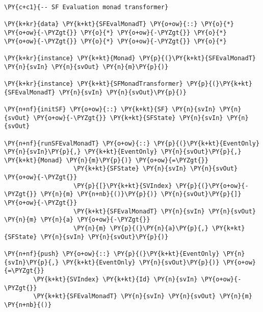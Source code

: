 \begin{Verbatim}[commandchars=\\\{\}]
\PY{c+c1}{-- SF Evaluation monad transformer}

\PY{k+kr}{data} \PY{k+kt}{SFEvalMonadT} \PY{o+ow}{::} \PY{o}{*} \PY{o+ow}{-\PYZgt{}} \PY{o}{*} \PY{o+ow}{-\PYZgt{}} \PY{o}{*} \PY{o+ow}{-\PYZgt{}} \PY{o}{*} \PY{o+ow}{-\PYZgt{}} \PY{o}{*}

\PY{k+kr}{instance} \PY{k+kt}{Monad} \PY{p}{(}\PY{k+kt}{SFEvalMonadT} \PY{n}{svIn} \PY{n}{svOut} \PY{n}{m}\PY{p}{)}

\PY{k+kr}{instance} \PY{k+kt}{SFMonadTransformer} \PY{p}{(}\PY{k+kt}{SFEvalMonadT} \PY{n}{svIn} \PY{n}{svOut}\PY{p}{)}

\PY{n+nf}{initSF} \PY{o+ow}{::} \PY{k+kt}{SF} \PY{n}{svIn} \PY{n}{svOut} \PY{o+ow}{-\PYZgt{}} \PY{k+kt}{SFState} \PY{n}{svIn} \PY{n}{svOut}

\PY{n+nf}{runSFEvalMonadT} \PY{o+ow}{::} \PY{p}{(}\PY{k+kt}{EventOnly} \PY{n}{svIn}\PY{p}{,} \PY{k+kt}{EventOnly} \PY{n}{svOut}\PY{p}{,} \PY{k+kt}{Monad} \PY{n}{m}\PY{p}{)} \PY{o+ow}{=\PYZgt{}} 
                   \PY{k+kt}{SFState} \PY{n}{svIn} \PY{n}{svOut} \PY{o+ow}{-\PYZgt{}}
                   \PY{p}{[}\PY{k+kt}{SVIndex} \PY{p}{(}\PY{o+ow}{-\PYZgt{}} \PY{n}{m} \PY{n+nb}{()}\PY{p}{)} \PY{n}{svOut}\PY{p}{]} \PY{o+ow}{-\PYZgt{}}
                   \PY{k+kt}{SFEvalMonadT} \PY{n}{svIn} \PY{n}{svOut} \PY{n}{m} \PY{n}{a} \PY{o+ow}{-\PYZgt{}}
                   \PY{n}{m} \PY{p}{(}\PY{n}{a}\PY{p}{,} \PY{k+kt}{SFState} \PY{n}{svIn} \PY{n}{svOut}\PY{p}{)}

\PY{n+nf}{push} \PY{o+ow}{::} \PY{p}{(}\PY{k+kt}{EventOnly} \PY{n}{svIn}\PY{p}{,} \PY{k+kt}{EventOnly} \PY{n}{svOut}\PY{p}{)} \PY{o+ow}{=\PYZgt{}}
		\PY{k+kt}{SVIndex} \PY{k+kt}{Id} \PY{n}{svIn} \PY{o+ow}{-\PYZgt{}}
		\PY{k+kt}{SFEvalMonadT} \PY{n}{svIn} \PY{n}{svOut} \PY{n}{m} \PY{n+nb}{()}
\end{Verbatim}
